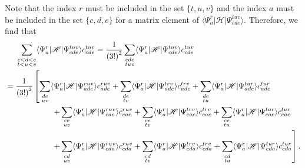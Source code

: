\documentclass[a4paper]{book}
\newcounter{solution}[chapter]
\begin{document}
	\begin{solution}
	
	Note that the index $r$ must be included in the set $\{ t, u, v \}$ and the index $a$ must be included in the set $\{ c,d,e\}$ for a matrix element of $\langle \Psi^r_a | \mathscr{H} | \Psi^{tuv}_{cde} \rangle$. Therefore, we find that
	\begin{align*}
		&\hspace{1.4em}\sum_{ \substack{ c<d<e \\ t<u<v } } \langle \Psi^r_a | \mathscr{H} | \Psi^{tuv}_{cde} \rangle c^{tuv}_{cde} = \frac{1}{\left(3!\right)^2} \sum_{ \substack{ cde \\ tuv} } \langle \Psi^r_a | \mathscr{H} | \Psi^{tuv}_{cde} \rangle c^{tuv}_{cde} \\
		&= \frac{1}{\left(3!\right)^2}  \left[ \sum_{ \substack{ de \\ uv } } \langle \Psi^r_a | \mathscr{H} | \Psi^{ruv}_{ade} \rangle c^{ruv}_{ade} + \sum_{ \substack{ de \\ tv } } \langle \Psi^r_a | \mathscr{H} | \Psi^{trv}_{ade} \rangle c^{trv}_{ade} + \sum_{ \substack{ de \\ tu } } \langle \Psi^r_a | \mathscr{H} | \Psi^{tur}_{ade} \rangle c^{tur}_{ade} \right. \\
		&\hspace{ 6em } \left. + \sum_{ \substack{ ce \\ uv } } \langle \Psi^r_a | \mathscr{H} | \Psi^{ruv}_{cae} \rangle c^{ruv}_{cae} + \sum_{ \substack{ ce \\ tv } } \langle \Psi^r_a | \mathscr{H} | \Psi^{trv}_{cae} \rangle c^{trv}_{cae} + \sum_{ \substack{ ce \\ tu } } \langle \Psi^r_a | \mathscr{H} | \Psi^{tur}_{cae} \rangle c^{tur}_{cae} \right. \\
		&\hspace{ 6em } \left. + \sum_{ \substack{ cd \\ uv } } \langle \Psi^r_a | \mathscr{H} | \Psi^{ruv}_{cda} \rangle c^{ruv}_{cda} + \sum_{ \substack{ cd \\ tv } } \langle \Psi^r_a | \mathscr{H} | \Psi^{trv}_{cda} \rangle c^{trv}_{cda} + \sum_{ \substack{ cd \\ tu } } \langle \Psi^r_a | \mathscr{H} | \Psi^{tur}_{cda} \rangle c^{tur}_{cda} \right] .
	\end{align*}
	

\end{solution}
\end{document}
